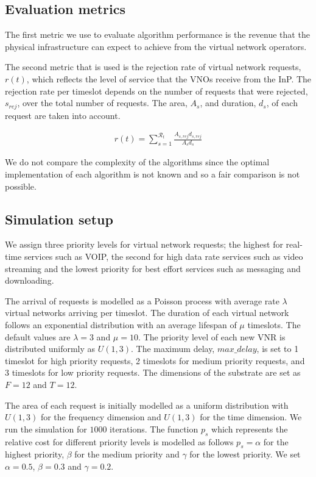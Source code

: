 \documentclass[conference]{IEEEtran}
\begin{document}
\subsection{Evaluation metrics }

The first metric we use to evaluate algorithm performance is the revenue that the physical infrastructure can expect to achieve from the virtual network operators.

The second metric that is used is the rejection rate of virtual network requests, $r(t)$, which reflects the level of service that the VNOs receive from the InP. The rejection rate per timeslot depends on the number of requests that were rejected, $s_{rej}$, over the total number of requests. The area, $A_s$, and duration, $d_s$, of each request are taken into account.

\begin{align}
\label{eqn10}
r(t) = \sum_{s=1}^{\mathcal{R}_t} \frac{ A_{s, rej}d_{s, rej}}{{A_s}{d_s}}
\end{align}


We do not compare the complexity of the algorithms since the optimal implementation of each algorithm is not known and so a fair comparison is not possible.

\subsection{Simulation setup}
We assign three priority levels for virtual network requests; the highest for real-time services such as VOIP, the second for high data rate services such as video streaming and the lowest priority for best effort services such as messaging and downloading.

The arrival of requests is modelled as a Poisson process with average rate $\lambda$ virtual networks arriving per timeslot. The duration of each virtual network follows an exponential distribution with an average lifespan of $\mu$ timeslots. The default values are $\lambda = 3$ and $\mu = 10$. The priority level of each new VNR is distributed uniformly as $U(1, 3)$. The maximum delay, $max\_{delay}$, is set to 1 timeslot for high priority requests, 2 timeslots for medium priority requests, and 3 timeslots for low priority requests. The dimensions of the substrate are set as $F = 12$ and $T = 12$.

The area of each request is initially modelled as a uniform distribution with $U(1, 3)$ for the frequency dimension and $U(1, 3)$ for the time dimension. We run the simulation for $1000$ iterations. The function $p_s$ which represents the relative cost for different priority levels is modelled as follows $p_s = \alpha$ for the highest priority, $\beta$ for the medium priority and $\gamma$ for the lowest priority. We set $\alpha=0.5$, $\beta=0.3$ and $\gamma=0.2$.
\end{document}
